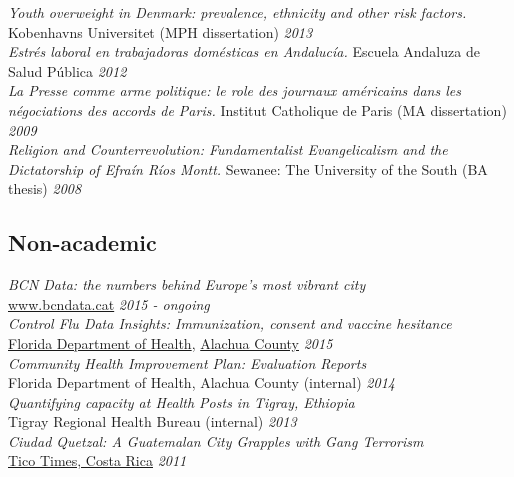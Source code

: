 \documentclass[11pt]{article}
\begin{document}
\noindent \emph{Youth overweight in Denmark: prevalence, ethnicity and other risk factors. } Kobenhavns Universitet (MPH dissertation) \hfill \emph{2013}\\

\noindent \emph{Estrés laboral en trabajadoras domésticas en Andalucía. } Escuela Andaluza de Salud Pública  \hfill \emph{2012}\\

\noindent \emph{La Presse comme arme politique: le role des journaux américains dans les négociations des accords de Paris.} Institut Catholique de Paris (MA dissertation) \hfill \emph{2009}\\

\noindent \emph{Religion and Counterrevolution: Fundamentalist Evangelicalism and the Dictatorship of Efraín Ríos Montt.} Sewanee: The University of the South (BA thesis) \hfill \emph{2008}\\

\subsection*{Non-academic}

\noindent \emph{BCN Data: the numbers behind Europe's most vibrant city}\\
\href{www.bcndata.cat}{www.bcndata.cat} \hfill \emph{2015 - ongoing}\\

\noindent \emph{Control Flu Data Insights: Immunization, consent and vaccine hesitance}\\ \href{http://economicsofmalaria.com/pdfs/estimating.pdf}{Florida Department of Health}, \href{http://economicsofmalaria.com/pdfs/targeting.pdf}{Alachua County} \hfill \emph{2015}\\

\noindent \emph{Community Health Improvement Plan: Evaluation Reports} \\ Florida Department of Health, Alachua County (internal) \hfill \emph{2014}\\

\noindent \emph{Quantifying capacity at Health Posts in Tigray, Ethiopia} \\ Tigray Regional Health Bureau (internal) \hfill \emph{2013}\\

\noindent \emph{Ciudad Quetzal: A Guatemalan City Grapples with Gang Terrorism} \\ 
\href{http://www.ticotimes.net/2011/04/15/guatemala-city-grapples-with-gang-terrorism}{Tico Times, Costa Rica} \hfill \emph{2011}\\
\end{document}
